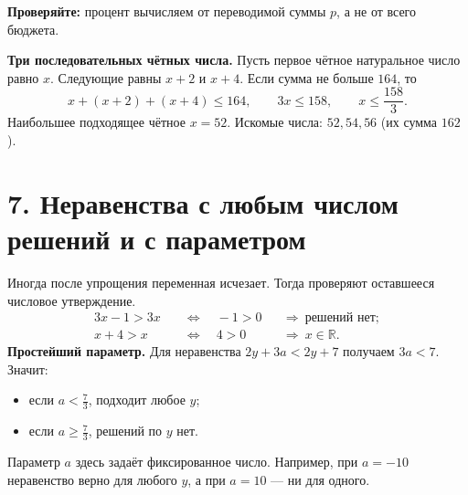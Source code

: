 \documentclass[a4paper,12pt]{article}
\newcommand{\lessonsection}[1]{\section*{#1}}
\begin{document}
\textbf{Проверяйте:} процент вычисляем от переводимой суммы $p$, а не от всего бюджета.

\textbf{Три последовательных чётных числа.} Пусть первое чётное натуральное число равно $x$. Следующие равны $x+2$ и $x+4$. Если сумма не больше $164$, то
\[x+(x+2)+(x+4)\le164,\qquad3x\le158,\qquad x\le\frac{158}{3}.\]
Наибольшее подходящее чётное $x=52$. Искомые числа: $52,54,56$ (их сумма $162$).

\clearpage
\lessonsection{7. Неравенства с любым числом решений и с параметром}
Иногда после упрощения переменная исчезает. Тогда проверяют оставшееся числовое утверждение.
\[
\begin{aligned}
3x-1>3x&\quad\Longleftrightarrow\quad -1>0&&\Rightarrow\ \text{решений нет};\\
x+4>x&\quad\Longleftrightarrow\quad 4>0&&\Rightarrow\ x\in\mathbb R.
\end{aligned}
\]
\textbf{Простейший параметр.} Для неравенства $2y+3a<2y+7$ получаем $3a<7$. Значит:
\begin{itemize}
\item если $a<\frac73$, подходит любое $y$;
\item если $a\ge\frac73$, решений по $y$ нет.
\end{itemize}
Параметр $a$ здесь задаёт фиксированное число. Например, при $a=-10$ неравенство верно для любого $y$, а при $a=10$ --- ни для одного.
\end{document}
